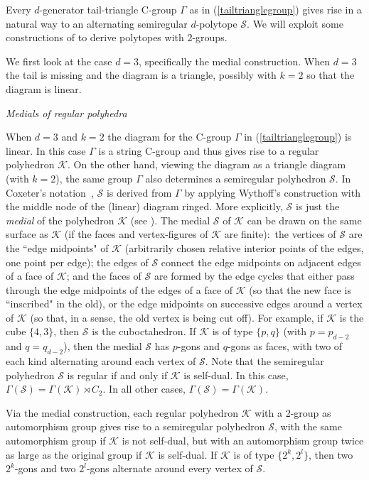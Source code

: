 \documentclass[12pt]{amsart}
\theoremstyle{definition}
\begin{document}
\noindent
Every $d$-generator tail-triangle C-group $\Gamma$ as in (\ref{tailtrianglegroup}) gives rise in a natural way to an alternating semiregular $d$-polytope $\mathcal S$. We will exploit some constructions of \cite{MonSch2012,MonSch2020} to derive polytopes with 2-groups.  

We first look at the case $d=3$, specifically the medial construction. When $d=3$ the tail is missing and the diagram is a triangle, possibly with $k=2$ so that the diagram is linear. 
\bigskip

\noindent
{\it Medials of regular polyhedra}
\medskip

When $d=3$ and $k=2$ the diagram for the C-group $\Gamma$ in (\ref{tailtrianglegroup}) is linear. In this case $\Gamma$ is a string C-group and thus gives rise to a regular polyhedron $\mathcal{K}$. On the other hand, viewing the diagram as a triangle diagram (with $k=2$), the same group $\Gamma$  also determines a semiregular polyhedron $\mathcal S$. In Coxeter's notation~\cite{Cox1973}, $\mathcal S$ is derived from $\Gamma$ by applying Wythoff's construction with the middle node of the (linear) diagram ringed. More explicitly, $\mathcal S$ is just the {\it medial\/} of the polyhedron $\mathcal{K}$ (see \cite{PisSer2013}). The medial $\mathcal S$ of $\mathcal K$ can be drawn on the same surface as $\mathcal K$ (if the faces and vertex-figures of $\mathcal K$ are finite):\ the vertices of $\mathcal S$ are the ``edge midpoints" of $\mathcal K$ (arbitrarily chosen relative interior points of the edges, one point per edge); the edges of $\mathcal S$ connect the edge midpoints on adjacent edges of a face of $\mathcal K$; and the faces of $\mathcal S$ are formed by the edge cycles that either pass through the edge midpoints of the edges of a face of $\mathcal K$ (so that the new face is ``inscribed" in the old), or the edge midpoints on successive edges around a vertex of $\mathcal{K}$ (so that, in a sense, the old vertex is being cut off). For example, if $\mathcal K$ is the cube $\{4,3\}$, then $\mathcal S$ is the cuboctahedron. If $\mathcal{K}$ is of type $\{p,q\}$ (with $p=p_{d-2}$ and $q=q_{d-2}$), then the medial $\mathcal S$ has $p$-gons and $q$-gons as faces, with two of each kind alternating around each vertex of $\mathcal S$. Note that the semiregular polyhedron $\mathcal S$ is regular if and only if $\mathcal K$ is self-dual. In this case, $\Gamma(\mathcal{S})=\Gamma(\mathcal{K})\rtimes C_2$. In all other cases, $\Gamma(\mathcal{S})=\Gamma(\mathcal{K})$.

Via the medial construction, each regular polyhedron $\mathcal K$ with a 2-group as automorphism group gives rise to a semiregular polyhedron $\mathcal S$, with the same automorphism group if $\mathcal{K}$ is not self-dual, but with an automorphism group twice as large as the original group if $\mathcal K$ is self-dual. If $\mathcal{K}$ is of type $\{2^k,2^l\}$, then two  $2^k$-gons and two $2^l$-gons alternate around every vertex of $\mathcal{S}$.
\bigskip
\end{document}
